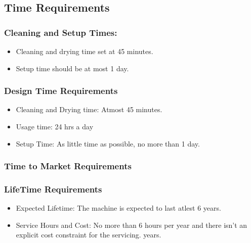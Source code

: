\documentclass[table]{rapportCS}
\begin{document}
\subsection{Time Requirements}\label{sec:timereq}
\subsubsection{Cleaning and Setup Times:}\label{sec: cnstimes}
    \begin{itemize}[label=$\bullet$]
      \item Cleaning and drying time set at 45 minutes.
      \item Setup time should be at most 1 day.
    \end{itemize}
\subsubsection{Design Time Requirements}\label{sec: destimereq}
    \begin{itemize}[label=$\bullet$]
      \item Cleaning and Drying time: Atmost 45 minutes.
      \item Usage time: 24 hrs a day
      \item Setup Time: As little time as possible, no more than 1 day.
    \end{itemize}
  
  \subsubsection{Time to Market Requirements}\label{sec: timemarketreq}
  \subsubsection{LifeTime Requirements}\label{sec: lifetimereq}
    \begin{itemize}[label=$\bullet$]
      \item Expected Lifetime: The machine is expected to last atlest 6 years.
      \item Service Hours and Cost: No more than 6 hours per year and there isn’t an explicit cost constraint for the servicing. years.
    \end{itemize}
\end{document}
